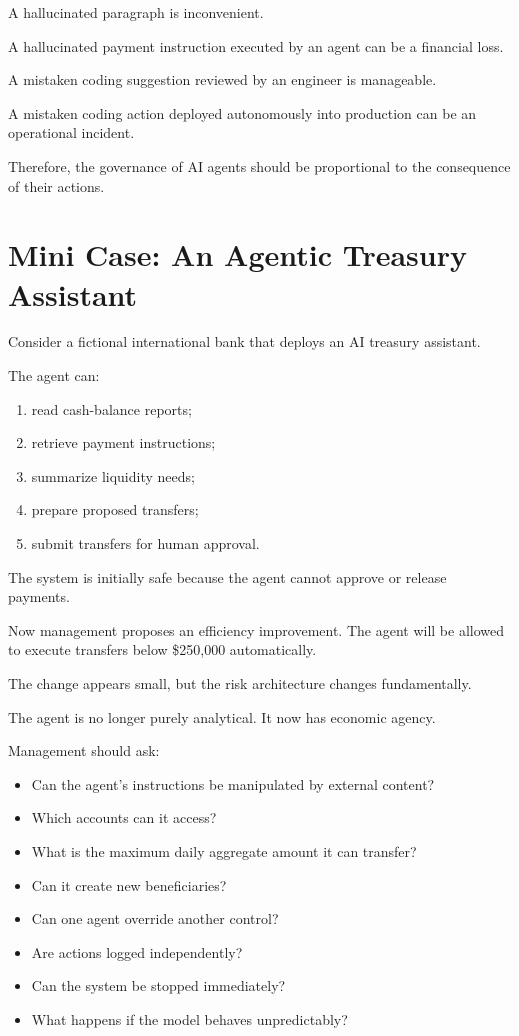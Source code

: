 A hallucinated paragraph is inconvenient.

A hallucinated payment instruction executed by an agent can be a financial loss.

A mistaken coding suggestion reviewed by an engineer is manageable.

A mistaken coding action deployed autonomously into production can be an operational incident.

Therefore, the governance of AI agents should be proportional to the consequence of their actions.

\section{Mini Case: An Agentic Treasury Assistant}

Consider a fictional international bank that deploys an AI treasury assistant.

The agent can:

\begin{enumerate}
    \item read cash-balance reports;
    \item retrieve payment instructions;
    \item summarize liquidity needs;
    \item prepare proposed transfers;
    \item submit transfers for human approval.
\end{enumerate}

The system is initially safe because the agent cannot approve or release payments.

Now management proposes an efficiency improvement. The agent will be allowed to execute transfers below \$250,000 automatically.

The change appears small, but the risk architecture changes fundamentally.

The agent is no longer purely analytical. It now has economic agency.

Management should ask:

\begin{itemize}
    \item Can the agent's instructions be manipulated by external content?
    \item Which accounts can it access?
    \item What is the maximum daily aggregate amount it can transfer?
    \item Can it create new beneficiaries?
    \item Can one agent override another control?
    \item Are actions logged independently?
    \item Can the system be stopped immediately?
    \item What happens if the model behaves unpredictably?
\end{itemize}

